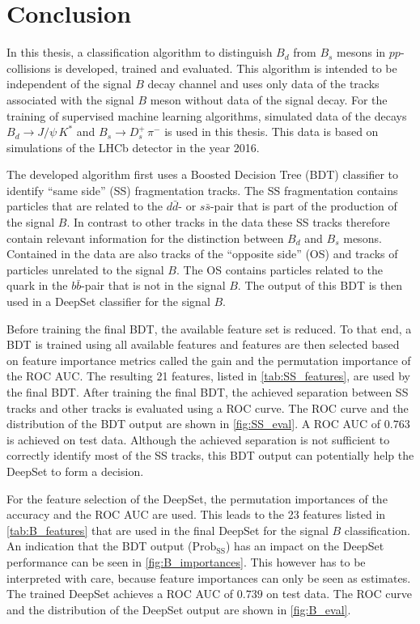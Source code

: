 \chapter{Conclusion}

In this thesis, a classification algorithm to distinguish $B_d$ from $B_s$ mesons in $pp$-collisions is developed, trained and evaluated.
This algorithm is intended to be independent of the signal $B$ decay channel and uses only data of the tracks associated with the signal $B$ meson without data of the signal decay.
For the training of supervised machine learning algorithms, simulated data of the decays $B_d \rightarrow J/\psi \, K^*$ and $B_s \rightarrow D^+_s \, \pi^-$ is used in this thesis. This data is based on simulations of the LHCb detector in the year 2016.

The developed algorithm first uses a Boosted Decision Tree (BDT) classifier to identify \enquote{same side} (SS) fragmentation tracks.
The SS fragmentation contains particles that are related to the $d\bar{d}$- or $s\bar{s}$-pair that is part of the production of the signal $B$. 
In contrast to other tracks in the data these SS tracks therefore contain relevant information for the distinction between $B_d$ and $B_s$ mesons.
Contained in the data are also tracks of the \enquote{opposite side} (OS) and tracks of particles unrelated to the signal $B$.
The OS contains particles related to the quark in the $b\bar{b}$-pair that is not in the signal $B$.
The output of this BDT is then used in a DeepSet classifier for the signal $B$.

Before training the final BDT, the available feature set is reduced.
To that end, a BDT is trained using all available features and features are then selected based on feature importance metrics called the gain and the permutation importance of the ROC AUC. The resulting 21 features, listed in \autoref{tab:SS_features}, are used by the final BDT.
After training the final BDT, the achieved separation between SS tracks and other tracks is evaluated using a ROC curve.
The ROC curve and the distribution of the BDT output are shown in \autoref{fig:SS_eval}. A ROC AUC of $0.763$ is achieved on test data.
Although the achieved separation is not sufficient to correctly identify most of the SS tracks, this BDT output can potentially help the DeepSet to form a decision.

For the feature selection of the DeepSet, the permutation importances of the accuracy and the ROC AUC are used.
This leads to the 23 features listed in \autoref{tab:B_features} that are used in the final DeepSet for the signal $B$ classification.
An indication that the BDT output ($\text{Prob}_\text{SS}$) has an impact on the DeepSet performance can be seen in \autoref{fig:B_importances}.
This however has to be interpreted with care, because feature importances can only be seen as estimates.
The trained DeepSet achieves a ROC AUC of $0.739$ on test data.
The ROC curve and the distribution of the DeepSet output are shown in \autoref{fig:B_eval}.

